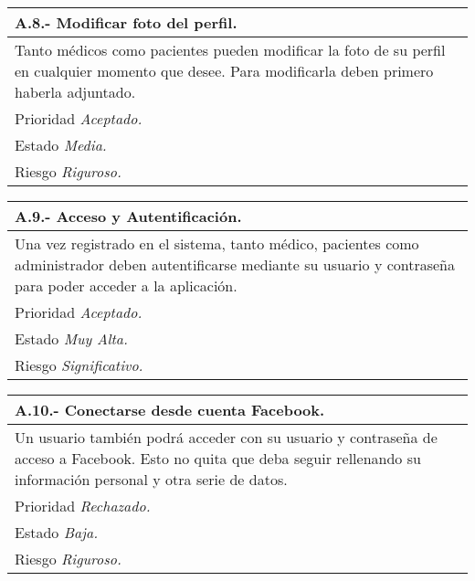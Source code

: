 \documentclass[a4paper,oneside,11pt]{book}
\begin{document}
\begin{center}
\begin{tabulary}{15cm}{|L|}
	\hline
		\bf{A.8.- Modificar foto del perfil.} \\
	\hline
		Tanto médicos como pacientes pueden modificar la foto de su perfil en cualquier momento que desee. Para modificarla deben primero haberla adjuntado. \\
	\hline
		Prioridad \textit{Aceptado.} \\
	\hline
		Estado \textit{Media.} \\
	\hline
		Riesgo \textit{Riguroso.} \\
	\hline
\end{tabulary}
\end{center}

\begin{center}
\begin{tabulary}{15cm}{|L|}
	\hline
		\bf{A.9.- Acceso y Autentificación.} \\
	\hline
		Una vez registrado en el sistema, tanto médico, pacientes como administrador deben autentificarse mediante su usuario y contraseña para poder acceder a la aplicación. \\
	\hline
		Prioridad \textit{Aceptado.} \\
	\hline
		Estado \textit{Muy Alta.} \\
	\hline
		Riesgo \textit{Significativo.} \\
	\hline
\end{tabulary}
\end{center}

\begin{center}
\begin{tabulary}{15cm}{|L|}
	\hline
		\bf{A.10.- Conectarse desde cuenta Facebook.} \\
	\hline
		Un usuario también podrá acceder con su usuario y contraseña de acceso a Facebook. Esto no quita que deba seguir rellenando su información personal y otra serie de datos. \\
	\hline
		Prioridad \textit{Rechazado.} \\
	\hline
		Estado \textit{Baja.} \\
	\hline
		Riesgo \textit{Riguroso.} \\
	\hline
\end{tabulary}
\end{center}
\end{document}
